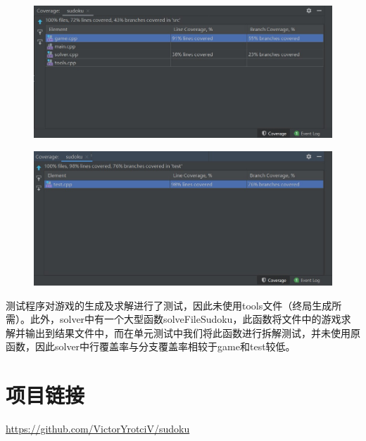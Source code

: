 \documentclass[a4paper]{article}
\begin{document}
\begin{figure}[H]
  \centering
  \includegraphics[scale=0.75]{images/cov_1.jpg}
  \label{fig:cov_1}
\end{figure}

\begin{figure}[H]
  \centering
  \includegraphics[scale=0.75]{images/cov_2.jpg}
  \label{fig:cov_2}
\end{figure}

测试程序对游戏的生成及求解进行了测试，因此未使用tools文件（终局生成所需）。此外，solver中有一个大型函数solveFileSudoku，此函数将文件中的游戏求解并输出到结果文件中，而在单元测试中我们将此函数进行拆解测试，并未使用原函数，因此solver中行覆盖率与分支覆盖率相较于game和test较低。
\section{项目链接}

\href{https://github.com/VictorYrotciV/sudoku}{https://github.com/VictorYrotciV/sudoku}
\end{document}
